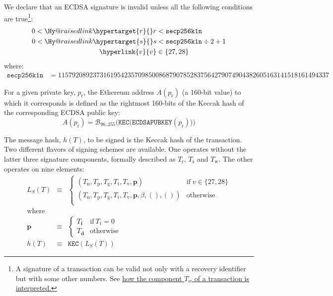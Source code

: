 \documentclass[9pt,oneside]{amsart}
\makeatletter
\newcommand{\linkdest}[1]{\Hy@raisedlink{\hypertarget{#1}{}}}
\makeatother
\begin{document}
\linkdest{invalidsig}We declare that an ECDSA signature is invalid unless all the following conditions are true\footnote{A signature of a transaction can be valid not only with a recovery identifier but with some other numbers.  See \hyperlink{T__w}{how the component $T_w$ of a transaction is interpreted.}}:
\begin{align}
0 < \linkdest{r}{r} &< \mathtt{secp256k1n} \\
0 < \linkdest{s}{s} &< \mathtt{secp256k1n} \div 2 + 1 \\
\hyperlink{v}{v} &\in \{27,28\}
\end{align}
where:
\begin{align}
\mathtt{secp256k1n} &= 115792089237316195423570985008687907852837564279074904382605163141518161494337
\end{align}

For a given private key, $p_{\mathrm{r}}$, the Ethereum address $A(p_{\mathrm{r}})$ (a 160-bit value) to which it corresponds is defined as the rightmost 160-bits of the Keccak hash of the corresponding ECDSA public key:
\begin{equation}
A(p_{\mathrm{r}}) = \mathcal{B}_{96..255}\big(\mathtt{KEC}\big( \mathtt{ECDSAPUBKEY}(p_{\mathrm{r}}) \big) \big)
\end{equation}

\hypertarget{h_of_T}{}The message hash, $h(T)$, to be signed is the Keccak hash of the transaction. Two different flavors of signing schemes are available. One operates without the latter three signature components, formally described as $T_{\mathrm{r}}$, $T_{\mathrm{s}}$ and $T_{\mathrm{w}}$. The other operates on nine elements:
\begin{eqnarray}
L_{S}(T) & \equiv & \begin{cases}
(T_{\mathrm{n}}, T_{\mathrm{p}}, T_{\mathrm{g}}, T_{\mathrm{t}}, T_{\mathrm{v}}, \mathbf{p}) & \text{if} \; v \in \{27, 28\} \\
(T_{\mathrm{n}}, T_{\mathrm{p}}, T_{\mathrm{g}}, T_{\mathrm{t}}, T_{\mathrm{v}}, \mathbf{p}, \beta, (), ()) & \text{otherwise} \\
\end{cases} \\
\nonumber \text{where} \\
\nonumber \mathbf{p} & \equiv & \begin{cases}
T_{\mathbf{i}} & \text{if}\ T_{\mathrm{t}} = 0 \\
T_{\mathbf{d}} & \text{otherwise}
\end{cases} \\
h(T) & \equiv & \mathtt{KEC}( L_{S}(T) )
\end{eqnarray}
\end{document}
